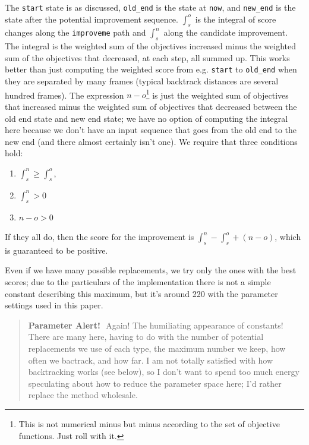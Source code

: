 \documentclass[twocolumn]{article}
\newcommand\parameteralert[1]{
  \begin{quotation}
  {\bf Parameter Alert!}\,\, #1
  \end{quotation}
}
\begin{document}
The {\tt start} state is as discussed, {\tt old\_end} is the state at
{\tt now}, and {\tt new\_end} is the state after the potential
improvement sequence. $\int_s^o$ is the integral of score changes
along the {\tt improveme} path and $\int_s^n$ along the candidate
improvement. The integral is the weighted sum of the objectives
increased minus the weighted sum of the objectives that decreased, at
each step, all summed up. This works better than just computing the
weighted score from e.g. {\tt start} to {\tt old\_end} when they are
separated by many frames (typical backtrack distances are several
hundred frames). The expression $n-o$\footnote{This is not numerical
  minus but minus according to the set of objective functions. Just
  roll with it.} is just the weighted sum of objectives that increased
minus the weighted sum of objectives that decreased between the old
end state and new end state; we have no option of computing the
integral here because we don't have an input sequence that goes from
the old end to the new end (and there almost certainly isn't one). We
require that three conditions hold:
\begin{enumerate}
\item $\int_s^n \geq \int_s^o$,
\item $\int_s^n > 0$
\item $n - o > 0$
\end{enumerate}

If they all do, then the score for the improvement is 
$\int_s^n - \int_s^o + (n - o)$, which is guaranteed to be positive.

Even if we have many possible replacements, we try only the ones with
the best scores; due to the particulars of the implementation there
is not a simple constant describing this maximum, but it's around 220
with the parameter settings used in this paper.

\parameteralert{
  Again! The humiliating appearance of constants! There are many here,
  having to do with the number of potential replacements we use of
  each type, the maximum number we keep, how often we bactrack, and
  how far. I am not totally satisfied with how backtracking works (see
  below), so I don't want to spend too much energy speculating about
  how to reduce the parameter space here; I'd rather replace the
  method wholesale.}
\end{document}
